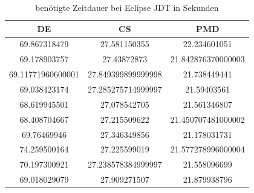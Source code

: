 \begin{appendices}
\begin{table}[]
    \centering
    \begin{tabular}{c|c|c}
DE & CS &PMD\\\hline
69.867318479&27.581150355&22.234601051 \\\hline
69.178903757&27.43872873&21.842876370000003 \\\hline
69.11771960600001&27.849399899999998&21.738449441 \\\hline
69.038423174&27.285275714999997&21.59403561 \\\hline
68.619945501&27.078542705&21.561346807 \\\hline
68.408704667&27.215509622&21.450707481000002 \\\hline
69.76469946&27.346349856&21.178031731 \\\hline
74.259500164&27.225599019&21.577278996000004 \\\hline
70.197300921&27.238578384999997&21.558096699 \\\hline
69.018029079&27.909271507&21.879938796 \\\hline
    \end{tabular}
    \caption{benötigte Zeitdauer bei Eclipse JDT in Sekunden}
    \label{tab:raw_eclipse}
\end{table}
\end{appendices}
	

